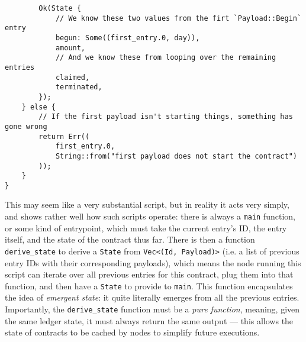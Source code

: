 \documentclass{extreport}
\begin{document}
\begin{verbatim}
        Ok(State {
            // We know these two values from the firt `Payload::Begin` entry
            begun: Some((first_entry.0, day)),
            amount,
            // And we know these from looping over the remaining entries
            claimed,
            terminated,
        });
    } else {
        // If the first payload isn't starting things, something has gone wrong
        return Err((
            first_entry.0,
            String::from("first payload does not start the contract")
        ));
    }
}
\end{verbatim}

This may seem like a very substantial script, but in reality it acts very simply, and shows rather well how such scripts operate: there is always a \texttt{main} function, or some kind of entrypoint, which must take the current entry's ID, the entry itself, and the state of the contract thus far. There is then a function \texttt{derive\_state} to derive a \texttt{State} from \texttt{Vec<(Id, Payload)>} (i.e. a list of previous entry IDs with their corresponding payloads), which means the node running this script can iterate over all previous entries for this contract, plug them into that function, and then have a \texttt{State} to provide to \texttt{main}. This function encapsulates the idea of \emph{emergent state}: it quite literally emerges from all the previous entries. Importantly, the \texttt{derive\_state} function must be a \emph{pure function}, meaning, given the same ledger state, it must always return the same output --- this allows the state of contracts to be cached by nodes to simplify future executions.
\end{document}
